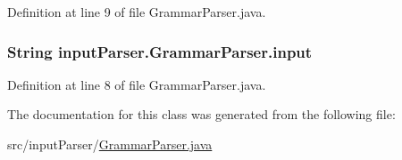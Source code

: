 Definition at line 9 of file Grammar\-Parser.\-java.

\hypertarget{classinput_parser_1_1_grammar_parser_a03e33c6cb945c3730c8c809457a2ed05}{
\subsubsection[{input}]{\setlength{\rightskip}{0pt plus 5cm}String {\bf input\-Parser.\-Grammar\-Parser.\-input}}}\label{classinput_parser_1_1_grammar_parser_a03e33c6cb945c3730c8c809457a2ed05}


Definition at line 8 of file Grammar\-Parser.\-java.



The documentation for this class was generated from the following file\-:\begin{DoxyCompactItemize}
\item 
src/input\-Parser/\hyperlink{_grammar_parser_8java}{Grammar\-Parser.\-java}\end{DoxyCompactItemize}

